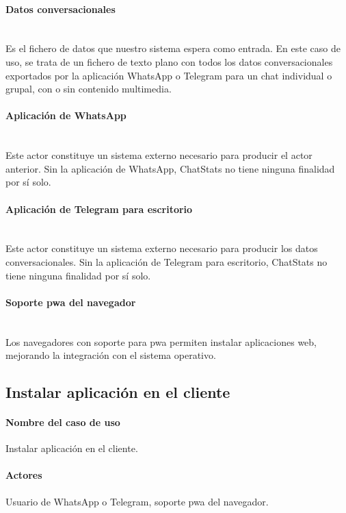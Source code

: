 \paragraph{Datos conversacionales}\mbox{}\\

Es el fichero de datos que nuestro sistema espera como entrada. En este caso de uso, se trata de un fichero de texto plano con todos los datos conversacionales exportados por la aplicación WhatsApp o Telegram para un chat individual o grupal, con o sin contenido multimedia.

\paragraph{Aplicación de WhatsApp}\mbox{}\\

Este actor constituye un sistema externo necesario para producir el actor anterior. Sin la aplicación de WhatsApp, ChatStats no tiene ninguna finalidad por sí solo.

\paragraph{Aplicación de Telegram para escritorio}\mbox{}\\

Este actor constituye un sistema externo necesario para producir los datos conversacionales. Sin la aplicación de Telegram para escritorio, ChatStats no tiene ninguna finalidad por sí solo.

\paragraph{Soporte \acrshort{pwa} del navegador}\mbox{}\\

Los navegadores con soporte para \acrfull{pwa} permiten instalar aplicaciones web, mejorando la integración con el sistema operativo.

\subsection{Instalar aplicación en el cliente}

\paragraph{Nombre del caso de uso} Instalar aplicación en el cliente.
\paragraph{Actores} Usuario de WhatsApp o Telegram, soporte \acrshort{pwa} del navegador.
